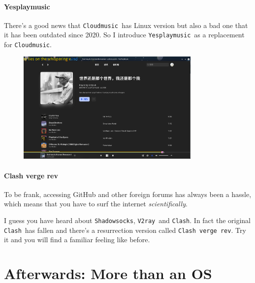 \documentclass[12pt]{ctexart}
\begin{document}
\paragraph{\textbf{Yesplaymusic}}

There's a good news that \texttt{Cloudmusic}\ has Linux
version but also a bad one that it has been outdated since 2020. So I
introduce \texttt{Yesplaymusic}\ as a replacement for
\texttt{Cloudmusic}.

\begin{figure}[H]
    \centering
    \includegraphics[width=0.8\textwidth,keepaspectratio]{assets/Linux/3.2 Decorate your own garden/13.png}
\end{figure}

\paragraph{\textbf{Clash verge rev}}

To be frank, accessing GitHub and other foreign forums has always been a
hassle, which means that you have to surf the internet
\emph{scientifically}.

I guess you have heard about \texttt{Shadowsocks}, \texttt{V2ray}\ and
\texttt{Clash}. In fact the original \texttt{Clash}\ has fallen and
there's a resurrection version called
\texttt{Clash\ verge\ rev}. Try it and you will find a familiar feeling
like before.

\newpage
\titleformat{\section}[block]{\normalfont\Large\bfseries\centering}{}{0pt}{}
\section*{\textbf{Afterwards: More than an OS}}
\end{document}
